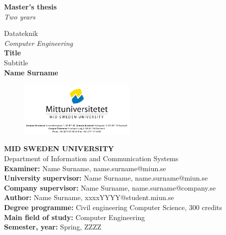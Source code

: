 \documentclass{report}
\begin{document}
{\sffamily
{}
\begin{titlepage}
\begin{tcolorbox}

\vspace{48ex}
\hspace*{6.8ex} \Huge{\textbf{Master's thesis}}\\
\hspace*{2.4ex} \textit{\LARGE{Two years}}\\
\vspace{3ex}

\hspace*{2.7ex} \large{Datateknik}\\
\hspace*{6ex} \textit{Computer Engineering}\\


\hspace*{6ex} \textbf{Title}\\
\hspace*{6.2ex} Subtitle\\


\hspace*{6ex} \textbf{Name Surname}\\
\vspace{6ex}
\end{tcolorbox}
\begin{figure}[h]
    \centering
    \includegraphics[width=0.5\textwidth,trim=4 4 4 4,clip]{Illustrations/miunlogo.png}
    \label{fig:my_label}
\end{figure}
\end{titlepage}
\restoregeometry
\vspace*{\fill}
\noindent\textbf{MID SWEDEN UNIVERSITY}\\
Department of Information and Communication Systems\\
\textbf{Examiner:} Name Surname, name.surname@miun.se\\
\textbf{University supervisor:} Name Surname, name.surname@miun.se\\
\textbf{Company supervisor:} Name Surname, name.surname@company.se\\
\textbf{Author:} Name Surname, xxxxYYYY@student.miun.se\\
\textbf{Degree programme:} Civil engineering Computer Science, 300 credits\\
\textbf{Main field of study:} Computer Engineering\\
\textbf{Semester, year:} Spring, ZZZZ  \\
\newpage
{}
}
\end{document}
